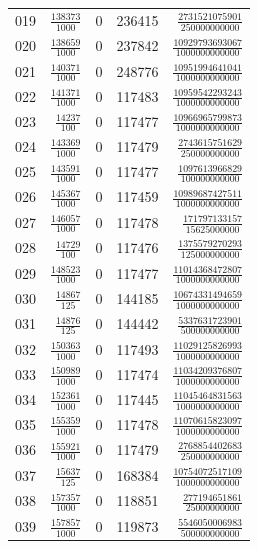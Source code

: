 \begin{longtable}{@{}rrrrr@{}}
019 & $\frac{138373}{1000}$ & 0 & 236415 & $\frac{2731521075901}{250000000000}$\\[3pt]
020 & $\frac{138659}{1000}$ & 0 & 237842 & $\frac{10929793693067}{1000000000000}$\\[3pt]
021 & $\frac{140371}{1000}$ & 0 & 248776 & $\frac{10951994641041}{1000000000000}$\\[3pt]
022 & $\frac{141371}{1000}$ & 0 & 117483 & $\frac{10959542293243}{1000000000000}$\\[3pt]
023 & $\frac{14237}{100}$ & 0 & 117477 & $\frac{10966965799873}{1000000000000}$\\[3pt]
024 & $\frac{143369}{1000}$ & 0 & 117479 & $\frac{2743615751629}{250000000000}$\\[3pt]
025 & $\frac{143591}{1000}$ & 0 & 117477 & $\frac{1097613966829}{100000000000}$\\[3pt]
026 & $\frac{145367}{1000}$ & 0 & 117459 & $\frac{10989687427511}{1000000000000}$\\[3pt]
027 & $\frac{146057}{1000}$ & 0 & 117478 & $\frac{171797133157}{15625000000}$\\[3pt]
028 & $\frac{14729}{100}$ & 0 & 117476 & $\frac{1375579270293}{125000000000}$\\[3pt]
029 & $\frac{148523}{1000}$ & 0 & 117477 & $\frac{11014368472807}{1000000000000}$\\[3pt]
030 & $\frac{14867}{125}$ & 0 & 144185 & $\frac{10674331494659}{1000000000000}$\\[3pt]
031 & $\frac{14876}{125}$ & 0 & 144442 & $\frac{5337631723901}{500000000000}$\\[3pt]
032 & $\frac{150363}{1000}$ & 0 & 117493 & $\frac{11029125826993}{1000000000000}$\\[3pt]
033 & $\frac{150989}{1000}$ & 0 & 117474 & $\frac{11034209376807}{1000000000000}$\\[3pt]
034 & $\frac{152361}{1000}$ & 0 & 117445 & $\frac{11045464831563}{1000000000000}$\\[3pt]
035 & $\frac{155359}{1000}$ & 0 & 117478 & $\frac{11070615823097}{1000000000000}$\\[3pt]
036 & $\frac{155921}{1000}$ & 0 & 117479 & $\frac{2768854402683}{250000000000}$\\[3pt]
037 & $\frac{15637}{125}$ & 0 & 168384 & $\frac{10754072517109}{1000000000000}$\\[3pt]
038 & $\frac{157357}{1000}$ & 0 & 118851 & $\frac{277194651861}{25000000000}$\\[3pt]
039 & $\frac{157857}{1000}$ & 0 & 119873 & $\frac{5546050006983}{500000000000}$\\[3pt]

\end{longtable}

